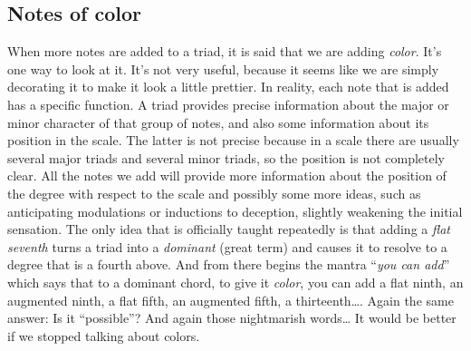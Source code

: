 \documentclass[]{report}
\begin{document}
\subsection{Notes of color}
When more notes are added to a triad, it is said that we are adding \emph{color}. It's one way to look at it. It's not very useful, because it seems like we are simply decorating it to make it look a little prettier.
In reality, each note that is added has a specific function. A triad provides precise information about the major or minor character of that group of notes, and also some information about its position in the scale. The latter is not precise because in a scale there are usually several major triads and several minor triads, so the position is not completely clear. All the notes we add will provide more information about the position of the degree with respect to the scale and possibly some more ideas, such as anticipating modulations or inductions to deception, slightly weakening the initial sensation.
The only idea that is officially taught repeatedly is that adding a \emph{flat seventh} turns a triad into a \emph{dominant} (great term) and causes it to resolve to a degree that is a fourth above. And from there begins the mantra ``\emph{you can add}'' which says that to a dominant chord, to give it \emph{color}, you can add a flat ninth, an augmented ninth, a flat fifth, an augmented fifth, a thirteenth\ldots.
Again the same answer: Is it ``possible''? And again those nightmarish words\ldots{}
It would be better if we stopped talking about colors.
\end{document}

